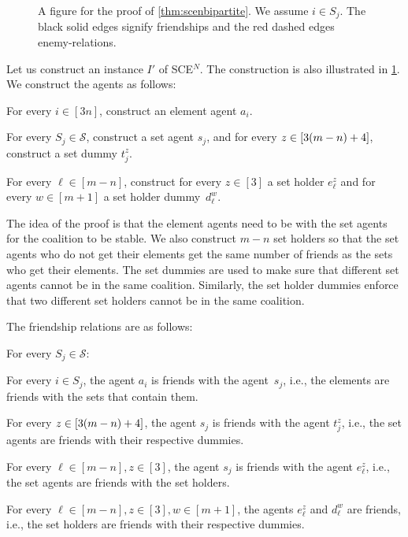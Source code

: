 \documentclass[a4paper,fleqn]{cas-sc}
\newcommand{\SCE}{SCE\xspace}
\newcommand{\neut}[1]{#1\unskip$^{N}$}
\newcommand{\sets}{\ensuremath{\mathcal{S}}}
\newcommand{\elements}{\ensuremath{[3n]}}
\newcommand{\sset}[1]{\ensuremath{S_{#1}}}
\begin{document}
{\begin{figure}
    \caption{A figure for the proof of \cref{thm:scenbipartite}. We assume $i \in S_j$. The black solid edges signify friendships and the red dashed edges enemy-relations.}
    \label{fig:scenbipartite}
\end{figure}

Let us construct an instance $I'$ of \neut{\SCE}. The construction is also illustrated in \cref{fig:scenbipartite}.
We construct the agents as follows:
\begin{compactitem}
\item For every $i \in \elements$, construct an element agent $a_i$.
\item For every $\sset j \in \sets$, construct a set agent $s_j$, and for every $z \in [3(m -n) + 4]$, construct a set dummy $t^z_j$.
\item For every $\ell \in [m - n]$, construct for every $z \in [3]$ a set holder $e^z_\ell$ and for every $w \in [m + 1]$ a set holder dummy~$d^w_\ell$.
\end{compactitem}
The idea of the proof is that the element agents need to be with the set agents for the coalition to be stable.
We also construct $m - n$ set holders so that the set agents who do not get their elements get the same number of friends as the sets who get their elements.
The set dummies are used to make sure that different set agents cannot be in the same coalition.
Similarly, the set holder dummies enforce that two different set holders cannot be in the same coalition.

The friendship relations are as follows:
\begin{compactitem}
\item For every $\sset j \in \sets$:
\begin{compactitem}
\item For every $i \in \sset j$, the agent $a_i$ is friends with the agent~$s_j$, i.e., the elements are friends with the sets that contain them.
\item For every $z \in [3(m -n) + 4]$, the agent $s_j$ is friends with the agent $t^z_j$, i.e., the set agents are friends with their respective dummies.
\item For every $\ell \in [m - n], z \in [3]$, the agent $s_j$ is friends with the agent $e^z_\ell$, i.e., the set agents are friends with the set holders.
\end{compactitem}
\item For every $\ell \in [m - n], z \in [3], w \in [m + 1]$, the agents $e^z_\ell$ and $d^w_\ell$ are friends, i.e., the set holders are friends with their respective dummies.
\end{compactitem}

}
\end{document}
